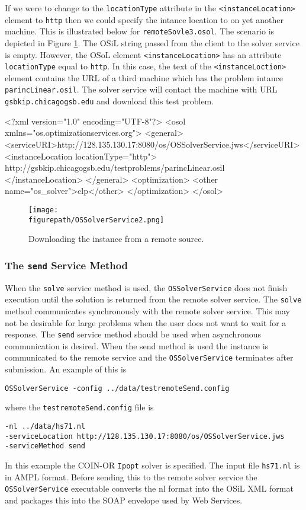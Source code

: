 \documentclass[11pt]{article}
\newcommand{\figurepath}{./figures}
\newcounter{Fig}
\renewcommand{\_}{{\char"5F}}
\renewcommand{\{}{{\char"7B}}
\renewcommand{\}}{{\char"7D}}
\renewcommand{\^}{{\char"0D}}
\renewcommand{\'}{{\char"0D}}
\begin{document}
If we were to change to the {\tt locationType} attribute in the {\tt <instanceLocation>} element to {\tt http} then we could specify the intance location to on yet another machine. This is illustrated below  for {\tt remoteSovle3.osol}.  The scenario is depicted in Figure \ref{figure:ossolverservice2}.  The OSiL string passed from the client to the solver service is empty.  However, the OSoL element {\tt <instanceLocation>}  has an attribute {\tt locationType} equal to   {\tt http}.  In this case, the text of the {\tt <instanceLoction>} element contains the URL of a third machine which has the problem intance {\tt parincLinear.osil}.  The solver service will contact the machine with URL {\tt gsbkip.chicagogsb.edu} and download this test problem. 
\begin{verbatimtab}[4]
<?xml version="1.0" encoding="UTF-8"?>
<osol xmlns="os.optimizationservices.org">
    <general>
        <serviceURI>http://128.135.130.17:8080/os/OSSolverService.jws</serviceURI>
         <instanceLocation locationType="http">
	 http://gsbkip.chicagogsb.edu/testproblems/parincLinear.osil
	 </instanceLocation>
    </general>
    <optimization>
    	<other name="os_solver">clp</other>
    </optimization>
</osol>
\end{verbatimtab}

\begin{figure}
\centering
\texttt{[image: \\figurepath/OSSolverService2.png]}
\caption{Downloading the instance from a remote source.} 
\label{figure:ossolverservice2}
\end{figure}

\subsubsection{The  {\tt send} Service Method}\label{section:send}

When the {\tt solve} service method is used, the {\tt OSSolverService} does not finish execution until the solution is returned from the remote solver service. The {\tt solve} method communicates synchronously with the remote solver service. This may not be desirable for large problems when the user does not want to wait for a response. The {\tt send} service method should be used when asynchronous communication is desired. When the send method is used the instance is communicated to the remote service and the {\tt OSSolverService} terminates after submission. An example of this is
\begin{verbatim}
OSSolverService -config ../data/testremoteSend.config
\end{verbatim}
where the {\tt testremoteSend.config} file is
\begin{verbatim}
-nl ../data/hs71.nl
-serviceLocation http://128.135.130.17:8080/os/OSSolverService.jws
-serviceMethod send
\end{verbatim}
In this example the COIN-OR {\tt Ipopt} solver is specified. The input file {\tt hs71.nl} is in AMPL format. Before sending this to the remote solver service the {\tt OSSolverService} executable converts  the nl format into the OSiL XML format and packages this into the SOAP envelope used by Web Services. 
\end{document}
